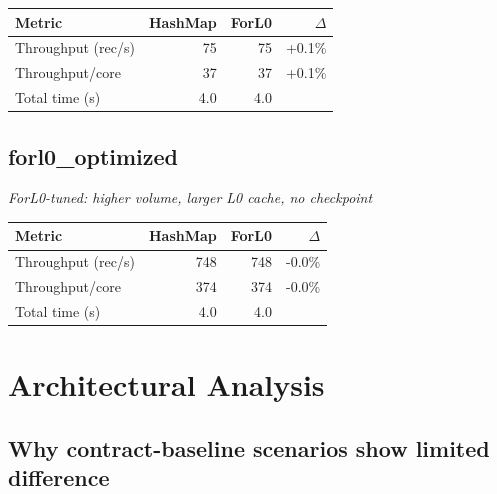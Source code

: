\documentclass[11pt,a4paper]{article}
\begin{document}
\begin{table}[h]
\centering
\begin{tabular}{lrrr}
\toprule
\textbf{Metric} & \textbf{HashMap} & \textbf{ForL0} & $\Delta$ \\
\midrule

Throughput (rec/s) & 75 & 75 & +0.1\% \\

Throughput/core & 37 & 37 & +0.1\% \\

Total time (s) & 4.0 & 4.0 &  \\

\bottomrule
\end{tabular}
\end{table}


\subsection{forl0\_optimized}

\textit{ForL0-tuned: higher volume, larger L0 cache, no checkpoint}

\begin{table}[h]
\centering
\begin{tabular}{lrrr}
\toprule
\textbf{Metric} & \textbf{HashMap} & \textbf{ForL0} & $\Delta$ \\
\midrule

Throughput (rec/s) & 748 & 748 & -0.0\% \\

Throughput/core & 374 & 374 & -0.0\% \\

Total time (s) & 4.0 & 4.0 &  \\

\bottomrule
\end{tabular}
\end{table}




\section{Architectural Analysis}

\subsection{Why contract-baseline scenarios show limited difference}
\end{document}
